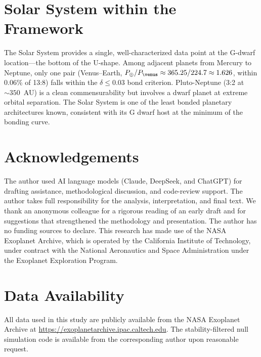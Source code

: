 \documentclass[twocolumn,usenatbib]{mnras}
\begin{document}
\section{Solar System within the Framework}

The Solar System provides a single, well-characterized data point at the
G-dwarf location---the bottom of the U-shape. Among adjacent planets from
Mercury to Neptune, only one pair (Venus--Earth, $P_\oplus/P_\venus \approx
365.25/224.7 \approx 1.626$, within 0.06\% of 13:8) falls
within the $\delta \leq 0.03$ bond criterion. Pluto-Neptune (3:2 at $\sim
350$~AU) is a clean commensurability but involves a dwarf planet at extreme
orbital separation. The Solar System is one of the least bonded planetary
architectures known, consistent with its G dwarf host at the minimum of the
bonding curve.

\section{Acknowledgements}

The author used AI language models (Claude, DeepSeek, and ChatGPT) for
drafting assistance, methodological discussion, and code-review support.
The author takes full responsibility for the analysis, interpretation, and
final text. We thank an anonymous colleague for a rigorous reading of an early
draft and for suggestions that strengthened the methodology and presentation.
The author has no funding sources to declare. This research has made use of
the NASA Exoplanet Archive, which is operated by the California Institute of
Technology, under contract with the National Aeronautics and Space
Administration under the Exoplanet Exploration Program.

\section*{Data Availability}

All data used in this study are publicly available from the NASA Exoplanet
Archive at \url{https://exoplanetarchive.ipac.caltech.edu}. The
stability-filtered null simulation code is available from the corresponding
author upon reasonable request.




\label{lastpage}
\end{document}
